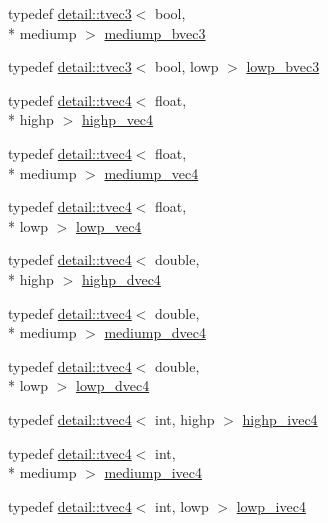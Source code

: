 \begin{DoxyCompactItemize}
typedef \hyperlink{structglm_1_1detail_1_1tvec3}{detail\-::tvec3}$<$ bool, \\*
mediump $>$ \hyperlink{group__core__precision_gae7c8d0136e829d6fe3feb00856e35f11}{mediump\-\_\-bvec3}
\item 
typedef \hyperlink{structglm_1_1detail_1_1tvec3}{detail\-::tvec3}$<$ bool, lowp $>$ \hyperlink{group__core__precision_ga17ac2986f7b315a2ac4ee2662b5be9cb}{lowp\-\_\-bvec3}
\item 
typedef \hyperlink{structglm_1_1detail_1_1tvec4}{detail\-::tvec4}$<$ float, \\*
highp $>$ \hyperlink{group__core__precision_gae32d5f99860247afbe7ed90564bceac1}{highp\-\_\-vec4}
\item 
typedef \hyperlink{structglm_1_1detail_1_1tvec4}{detail\-::tvec4}$<$ float, \\*
mediump $>$ \hyperlink{group__core__precision_ga2527a7f322907fecd58bef0a7a9c3ecd}{mediump\-\_\-vec4}
\item 
typedef \hyperlink{structglm_1_1detail_1_1tvec4}{detail\-::tvec4}$<$ float, \\*
lowp $>$ \hyperlink{group__core__precision_ga706ad1296c1cdcbd26c815fbb0f3f846}{lowp\-\_\-vec4}
\item 
typedef \hyperlink{structglm_1_1detail_1_1tvec4}{detail\-::tvec4}$<$ double, \\*
highp $>$ \hyperlink{group__core__precision_gad5ff5ff4a69e6925f5b4f540e2633835}{highp\-\_\-dvec4}
\item 
typedef \hyperlink{structglm_1_1detail_1_1tvec4}{detail\-::tvec4}$<$ double, \\*
mediump $>$ \hyperlink{group__core__precision_gac61cf2fc2df895e5f277c978dace042a}{mediump\-\_\-dvec4}
\item 
typedef \hyperlink{structglm_1_1detail_1_1tvec4}{detail\-::tvec4}$<$ double, \\*
lowp $>$ \hyperlink{group__core__precision_gad04432e5d5accf764e10c6674e5d0c96}{lowp\-\_\-dvec4}
\item 
typedef \hyperlink{structglm_1_1detail_1_1tvec4}{detail\-::tvec4}$<$ int, highp $>$ \hyperlink{group__core__precision_gaeba08fcf78aeae954c3335d73500ff8b}{highp\-\_\-ivec4}
\item 
typedef \hyperlink{structglm_1_1detail_1_1tvec4}{detail\-::tvec4}$<$ int, \\*
mediump $>$ \hyperlink{group__core__precision_gaa4c23a132d76436e041747b0c03265ad}{mediump\-\_\-ivec4}
\item 
typedef \hyperlink{structglm_1_1detail_1_1tvec4}{detail\-::tvec4}$<$ int, lowp $>$ \hyperlink{group__core__precision_gab9b404ae623385d5094499d2d4e4616d}{lowp\-\_\-ivec4}

\end{DoxyCompactItemize}
